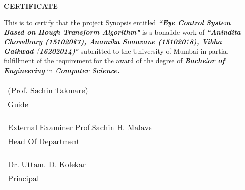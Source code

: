 \newpage
\thispagestyle{empty}
\vspace*{0.2cm}
\vspace{1cm}
\begin{center}
 \large\textbf{CERTIFICATE}
\end{center}
\vspace{1cm}


\par This is to certify that the project Synopsis entitled \textbf{\textit{``Eye Control System Based on Hough Transform
Algorithm"}} is a bonafide work of \textbf{\textit{``Anindita Chowdhury (15102067), Anamika Sonavane (15102018), Vibha Gaikwad (16202014)"}}  submitted to the University of Mumbai in partial fulfillment of the requirement for the award of the degree of \textbf{\textit{Bachelor of Engineering} }in\textbf{ \textit{Computer Science.}}\\

\vspace{30mm}
\begin{tabular}{@{}l@{}}
\hspace{3mm}(Prof. Sachin Takmare)\hspace{78mm}         \\
\hspace{3mm}   Guide \hspace{95mm}               \\
\end{tabular}



\vspace{30mm}
\begin{tabular}{@{}l@{}}
External Examiner	 \hspace{62mm}        Prof.Sachin H. Malave \\
 \hspace{98mm}             Head Of Department\\

\end{tabular}

\vspace{30mm}
\begin{tabular}{@{}l@{}}
 \hspace{61mm}        Dr. Uttam. D. Kolekar  \\
   \hspace{76mm}             Principal\\

\end{tabular}




\vspace{5mm}


















